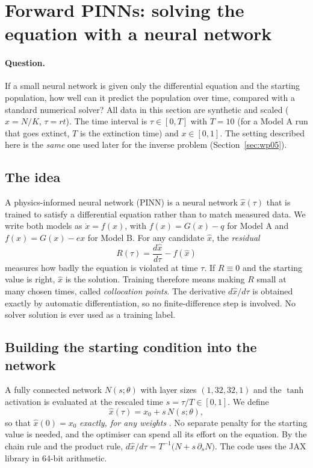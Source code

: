 \section{Forward PINNs: solving the equation with a neural network}
\label{sec:wp04}

\paragraph{Question.} If a small neural network is given only the differential equation and the starting population, how well can it predict the population over time, compared with a standard numerical solver? All data in this section are synthetic and scaled ($x=N/K$, $\tau=rt$). The time interval is $\tau\in[0,T]$ with $T=10$ (for a Model A run that goes extinct, $T$ is the extinction time) and $x\in[0,1]$. The setting described here is the \emph{same} one used later for the inverse problem (Section~\ref{sec:wp05}).

\subsection{The idea}
A physics-informed neural network (PINN) \cite{raissi2019physics} is a neural network $\hat x(\tau)$ that is trained to satisfy a differential equation rather than to match measured data. We write both models as $\dot x=f(x)$, with $f(x)=G(x)-q$ for Model A and $f(x)=G(x)-ex$ for Model B. For any candidate $\hat x$, the \emph{residual}
\begin{equation}
R(\tau)=\frac{d\hat x}{d\tau}-f(\hat x)
\end{equation}
measures how badly the equation is violated at time $\tau$. If $R\equiv0$ and the starting value is right, $\hat x$ is the solution. Training therefore means making $R$ small at many chosen times, called \emph{collocation points}. The derivative $d\hat x/d\tau$ is obtained exactly by automatic differentiation, so no finite-difference step is involved. No solver solution is ever used as a training label.

\subsection{Building the starting condition into the network}
A fully connected network $N(s;\theta)$ with layer sizes $(1,32,32,1)$ and the $\tanh$ activation is evaluated at the rescaled time $s=\tau/T\in[0,1]$. We define
\begin{equation}
\hat x(\tau)=x_0+s\,N(s;\theta),
\end{equation}
so that $\hat x(0)=x_0$ \emph{exactly, for any weights} \cite{lagaris1998artificial}. No separate penalty for the starting value is needed, and the optimiser can spend all its effort on the equation. By the chain rule and the product rule, $d\hat x/d\tau=T^{-1}\bigl(N+s\,\partial_sN\bigr)$. The code uses the JAX library \cite{jax2018github} in 64-bit arithmetic.

